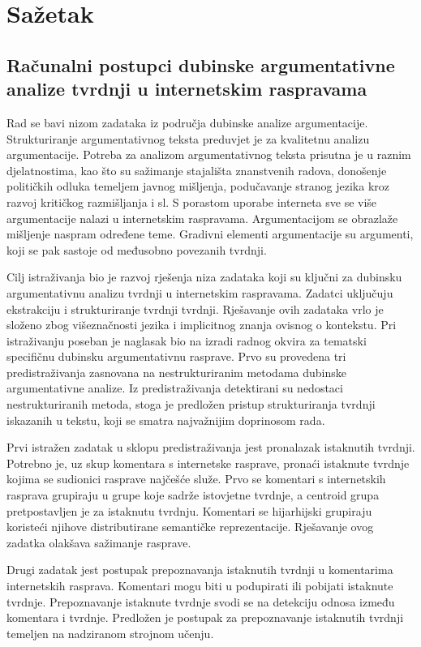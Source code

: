 \section*{Sažetak}

\subsection*{Računalni postupci dubinske argumentativne analize tvrdnji u internetskim raspravama}

Rad se bavi nizom zadataka iz područja dubinske analize argumentacije. 
Strukturiranje argumentativnog teksta 
preduvjet je za kvalitetnu analizu argumentacije. 
Potreba za analizom argumentativnog teksta prisutna je u raznim djelatnostima, 
kao što su sažimanje stajališta znanstvenih radova, 
donošenje političkih odluka temeljem javnog mišljenja, 
podučavanje stranog jezika kroz razvoj kritičkog razmišljanja 
i sl. S porastom uporabe interneta sve se više argumentacije nalazi u
internetskim raspravama. Argumentacijom se obrazlaže mišljenje naspram
određene teme. Gradivni elementi argumentacije su argumenti, koji se pak sastoje
od međusobno povezanih tvrdnji. 

Cilj istraživanja bio je razvoj rješenja niza zadataka koji su ključni za 
dubinsku argumentativnu analizu tvrdnji u internetskim raspravama. 
Zadatci uključuju ekstrakciju i strukturiranje tvrdnji tvrdnji. Rješavanje
ovih zadataka vrlo je složeno zbog višeznačnosti jezika i implicitnog 
znanja ovisnog o kontekstu. Pri istraživanju poseban je naglasak bio na izradi
radnog okvira za tematski specifičnu dubinsku argumentativnu rasprave. 
Prvo su provedena tri predistraživanja zasnovana na nestrukturiranim 
metodama dubinske argumentativne analize. Iz predistraživanja detektirani su 
nedostaci nestrukturiranih metoda, stoga je predložen pristup strukturiranja tvrdnji
iskazanih u tekstu, 
koji se smatra najvažnijim doprinosom rada. 

Prvi istražen zadatak u sklopu predistraživanja jest pronalazak istaknutih tvrdnji. 
Potrebno je, uz skup komentara s internetske rasprave, 
pronaći istaknute tvrdnje kojima se sudionici rasprave najčešće služe.  
Prvo se komentari s internetskih rasprava grupiraju u grupe
koje sadrže istovjetne tvrdnje, a centroid grupa pretpostavljen je za 
istaknutu tvrdnju. Komentari se hijarhijski grupiraju koristeći 
njihove distributirane semantičke reprezentacije. 
Rješavanje ovog zadatka olakšava sažimanje rasprave.

Drugi zadatak jest postupak prepoznavanja istaknutih tvrdnji u 
komentarima internetskih rasprava. 
Komentari mogu biti u podupirati ili pobijati istaknute tvrdnje. Prepoznavanje
istaknute tvrdnje svodi se na detekciju odnosa između komentara i tvrdnje. 
Predložen je postupak za prepoznavanje istaknutih tvrdnji 
temeljen na nadziranom strojnom učenju. 

